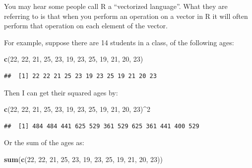 \documentclass[
]{book}
\newenvironment{Shaded}{\begin{snugshade}}{\end{snugshade}}
\newcommand{\DecValTok}[1]{\textcolor[rgb]{0.00,0.00,0.81}{#1}}
\newcommand{\FunctionTok}[1]{\textcolor[rgb]{0.13,0.29,0.53}{\textbf{#1}}}
\newcommand{\NormalTok}[1]{#1}
\newcommand{\SpecialCharTok}[1]{\textcolor[rgb]{0.81,0.36,0.00}{\textbf{#1}}}
\begin{document}
You may hear some people call R a ``vectorized language''. What they are referring to is that when you perform an operation on a vector in R it will often perform that operation on each element of the vector.

For example, suppose there are 14 students in a class, of the following ages:

\begin{Shaded}
\begin{Highlighting}[]
\FunctionTok{c}\NormalTok{(}\DecValTok{22}\NormalTok{, }\DecValTok{22}\NormalTok{, }\DecValTok{21}\NormalTok{, }\DecValTok{25}\NormalTok{, }\DecValTok{23}\NormalTok{, }\DecValTok{19}\NormalTok{, }\DecValTok{23}\NormalTok{, }\DecValTok{25}\NormalTok{, }\DecValTok{19}\NormalTok{, }\DecValTok{21}\NormalTok{, }\DecValTok{20}\NormalTok{, }\DecValTok{23}\NormalTok{)}
\end{Highlighting}
\end{Shaded}

\begin{verbatim}
##  [1] 22 22 21 25 23 19 23 25 19 21 20 23
\end{verbatim}

Then I can get their squared ages by:

\begin{Shaded}
\begin{Highlighting}[]
\FunctionTok{c}\NormalTok{(}\DecValTok{22}\NormalTok{, }\DecValTok{22}\NormalTok{, }\DecValTok{21}\NormalTok{, }\DecValTok{25}\NormalTok{, }\DecValTok{23}\NormalTok{, }\DecValTok{19}\NormalTok{, }\DecValTok{23}\NormalTok{, }\DecValTok{25}\NormalTok{, }\DecValTok{19}\NormalTok{, }\DecValTok{21}\NormalTok{, }\DecValTok{20}\NormalTok{, }\DecValTok{23}\NormalTok{)}\SpecialCharTok{\^{}}\DecValTok{2}
\end{Highlighting}
\end{Shaded}

\begin{verbatim}
##  [1] 484 484 441 625 529 361 529 625 361 441 400 529
\end{verbatim}

Or the sum of the ages as:

\begin{Shaded}
\begin{Highlighting}[]
\FunctionTok{sum}\NormalTok{(}\FunctionTok{c}\NormalTok{(}\DecValTok{22}\NormalTok{, }\DecValTok{22}\NormalTok{, }\DecValTok{21}\NormalTok{, }\DecValTok{25}\NormalTok{, }\DecValTok{23}\NormalTok{, }\DecValTok{19}\NormalTok{, }\DecValTok{23}\NormalTok{, }\DecValTok{25}\NormalTok{, }\DecValTok{19}\NormalTok{, }\DecValTok{21}\NormalTok{, }\DecValTok{20}\NormalTok{, }\DecValTok{23}\NormalTok{))}
\end{Highlighting}
\end{Shaded}
\end{document}
